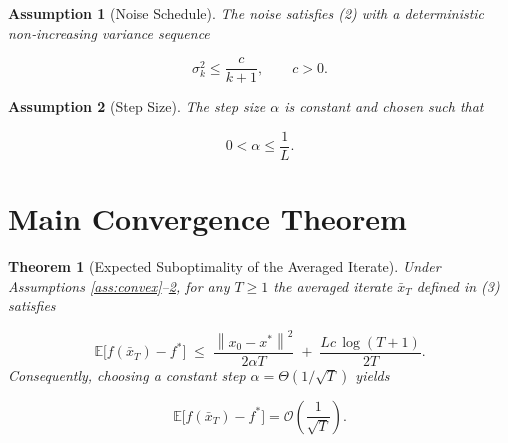 \documentclass[11pt]{article}
\newtheorem{theorem}{Theorem}
\newtheorem{assumption}{Assumption}
\newcommand{\E}{\mathbb{E}}
\newcommand{\norm}[1]{\left\|#1\right\|}
\begin{document}
\begin{assumption}[Noise Schedule]\label{ass:noise}
The noise satisfies (2) with a deterministic non‑increasing variance sequence  

\[
\sigma_{k}^{2}\le \frac{c}{k+1},\qquad c>0.
\tag{5}
\]
\end{assumption}

\begin{assumption}[Step Size]\label{ass:step}
The step size $\alpha$ is constant and chosen such that  

\[
0<\alpha\le\frac{1}{L}.
\tag{6}
\]
\end{assumption}

\section*{Main Convergence Theorem}
\begin{theorem}[Expected Suboptimality of the Averaged Iterate]\label{thm:main}
Under Assumptions \ref{ass:convex}–\ref{ass:step}, for any $T\ge1$ the
averaged iterate $\bar{x}_{T}$ defined in (3) satisfies  

\[
\E\!\bigl[f(\bar{x}_{T})-f^{*}\bigr]\;\le\;
\frac{\norm{x_{0}-x^{*}}^{2}}{2\alpha T}
\;+\;
\frac{Lc\,\log (T+1)}{2T}.
\tag{7}
\]
Consequently, choosing a constant step $\alpha=\Theta(1/\sqrt{T})$ yields  

\[
\E\!\bigl[f(\bar{x}_{T})-f^{*}\bigr]=\mathcal{O}\!\left(\frac{1}{\sqrt{T}}\right).
\tag{8}
\]
\end{theorem}

\end{document}
